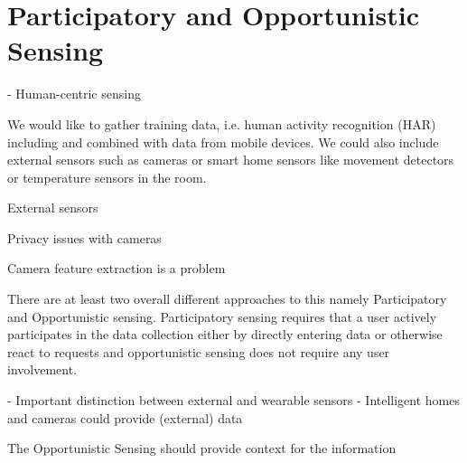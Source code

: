 

\section{Participatory and Opportunistic Sensing}
\label{sec:participatory_and_opportunistic_sensing}


- Human-centric sensing

We would like to gather training data, i.e. human activity recognition (HAR) including and combined with data from mobile devices. We could also include external sensors such as cameras or smart home sensors like movement detectors or temperature sensors in the room. 

External sensors 

Privacy issues with cameras 

Camera feature extraction is a problem



There are at least two overall different approaches to this namely Participatory and Opportunistic sensing. Participatory sensing requires that a user actively participates in the data collection either by directly entering data or otherwise react to requests and opportunistic sensing does not require any user involvement.



- Important distinction between external and wearable sensors 
- Intelligent homes and cameras could provide (external) data 

The Opportunistic Sensing should provide context for the information   


